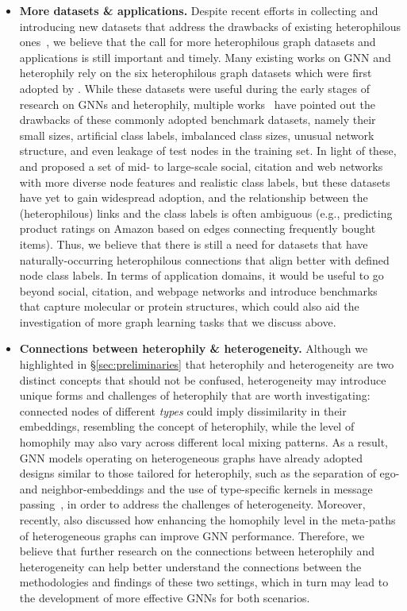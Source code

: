 \begin{itemize}
    \item \textbf{More datasets \& applications.} Despite recent efforts in collecting and introducing new datasets that address the drawbacks of existing heterophilous ones~\cite{lim2021large,platonov2023critical}, we believe that the call for more heterophilous graph datasets and applications is still important and timely. 
    Many existing works on GNN and heterophily rely on the six heterophilous graph datasets which were first adopted by \citet{Pei2020Geom-GCN}. 
    While these datasets were useful during the early stages of research on GNNs and heterophily, multiple works~\cite{zhu2020beyond,lim2021large,platonov2023critical} have pointed out the drawbacks of these commonly adopted benchmark datasets, namely their small sizes, artificial class labels, imbalanced class sizes, unusual network structure, and even leakage of test nodes in the training set. 
    In light of these, \citet{lim2021large} and \citet{platonov2023critical} proposed a set of mid- to large-scale social, citation and web networks with more diverse node features and realistic class labels, 
    but these datasets have yet to gain widespread adoption,
    and the relationship between the (heterophilous) links and the class labels is often ambiguous   
    (e.g., predicting product ratings on Amazon based on edges connecting frequently bought items). 
    Thus, we believe that there is still a need for datasets that have naturally-occurring heterophilous connections that align better with defined node class labels. 
    In terms of application domains, it would be useful to go beyond social, citation, and webpage networks and introduce benchmarks that capture 
    molecular or protein structures, which could also aid the investigation of more graph learning tasks that we discuss above. 
    
    \item \textbf{Connections between heterophily \& heterogeneity.} 
    Although we highlighted in \S\ref{sec:preliminaries} that heterophily and heterogeneity are two distinct concepts that should not be confused, heterogeneity may introduce unique forms and challenges of heterophily that are worth investigating: connected nodes of different \emph{types} could imply dissimilarity in their embeddings, resembling the concept of heterophily, while the level of homophily may also vary across different local mixing patterns. As a result, GNN models operating on heterogeneous graphs have already adopted designs similar to those tailored for heterophily, such as the separation of ego- and neighbor-embeddings and the use of type-specific kernels in message passing~\cite{schlichtkrull2018modeling}, in order to address the challenges of heterogeneity. Moreover, recently, \citet{guo2023homophily} also discussed how enhancing the homophily level in the meta-paths of heterogeneous graphs can improve GNN performance. Therefore, we believe that further research on the connections between heterophily and heterogeneity can help better understand the connections between the methodologies and findings of these two settings, which in turn may lead to the development of more effective GNNs for both scenarios.
\end{itemize}




